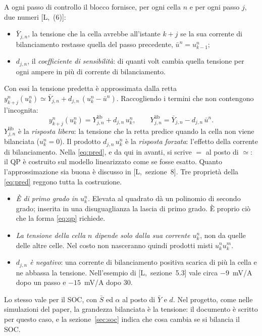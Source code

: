\documentclass[11pt,a4paper]{article}
\newcommand{\file}[1]{\texttt{\detokenize{#1}}}
\newcommand{\lib}{\mathrm{lib}}             %
\begin{document}
A ogni passo di controllo il blocco \file{Predizione_linearizzata} fornisce,
per ogni cella $n$ e per ogni passo $j$, due numeri [L,~(6)]:
\begin{itemize}
  \item $\bar Y_{j,n}$, la tensione che la cella avrebbe all'istante $k+j$ se
        la sua corrente di bilanciamento restasse quella del passo precedente,
        $\bar u^n = u^n_{k-1}$;
  \item $d_{j,n}$, il \emph{coefficiente di sensibilità}: di quanti volt cambia
        quella tensione per ogni ampere in più di corrente di bilanciamento.
\end{itemize}
Con essi la tensione predetta è approssimata dalla retta
$y^n_{k+j}(u^n_k) \simeq \bar Y_{j,n} + d_{j,n}\,(u^n_k - \bar u^n)$. Raccogliendo
i termini che non contengono l'incognita:
\begin{equation}
  y^n_{k+j}(u^n_k) = Y^\lib_{j,n} + d_{j,n}\,u^n_k ,
  \qquad
  Y^\lib_{j,n} = \bar Y_{j,n} - d_{j,n}\,\bar u^n .
  \label{eq:pred}
\end{equation}
$Y^\lib_{j,n}$ è la \emph{risposta libera}: la tensione che la retta predice
quando la cella non viene bilanciata ($u^n_k = 0$). Il prodotto $d_{j,n}\,u^n_k$ è
la \emph{risposta forzata}: l'effetto della corrente di bilanciamento. Nella
\eqref{eq:pred}, e da qui in avanti, si scrive $=$ al posto di $\simeq$: il QP
è costruito sul modello linearizzato come se fosse esatto. Quanto
l'approssimazione sia buona è discusso in [L,~sezione~8]. Tre proprietà della
\eqref{eq:pred} reggono tutta la costruzione.
\begin{itemize}
  \item \emph{È di primo grado in $u^n_k$.} Elevata al quadrato dà un polinomio
        di secondo grado; inserita in una disuguaglianza la lascia di primo
        grado. È proprio ciò che la forma \eqref{eq:qp} richiede.
  \item \emph{La tensione della cella $n$ dipende solo dalla sua corrente
        $u^n_k$}, non da quelle delle altre celle. Nel costo non nasceranno
        quindi prodotti misti $u^n_k u^m_k$.
  \item \emph{$d_{j,n}$ è negativo}: una corrente di bilanciamento positiva
        scarica di più la cella e ne abbassa la tensione. Nell'esempio di
        [L,~sezione~5.3] vale circa $-9$~mV/A dopo un passo e $-15$~mV/A dopo
        30.
\end{itemize}
Lo stesso vale per il SOC, con $\bar S$ ed $\alpha$ al posto di $\bar Y$ e $d$. Nel
progetto, come nelle simulazioni del paper, la grandezza bilanciata è la
tensione: il documento è scritto per questo caso, e la
sezione~\ref{sec:soc} indica che cosa cambia se si bilancia il SOC.
\end{document}
